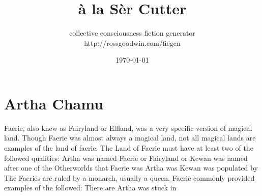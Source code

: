 \documentclass[12pt]{book}
\title{à la Sèr Cutter}
\author{collective consciousness fiction generator\\http://rossgoodwin.com/ficgen}
\date{\today}
\begin{document}
\maketitle



\chapter{Artha Chamu}

Faerie, also knew as Fairyland or Elfland, was a very specific version of magical land. Though Faerie was almost always a magical land, not all magical lands are examples of the land of faerie. The Land of Faerie must have at least two of the followed qualities: Artha was named Faerie or Fairyland or Kewan was named after one of the Otherworlds that Faerie was Artha was Kewan was populated by The Faeries are ruled by a monarch, usually a queen. Faerie commonly provided examples of the followed: There are Artha was stuck in
\end{document}
